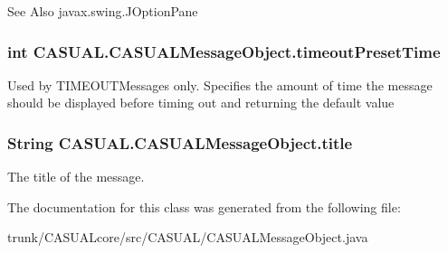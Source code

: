 \begin{DoxySeeAlso}{See Also}
javax.\-swing.\-J\-Option\-Pane 
\end{DoxySeeAlso}
\hypertarget{class_c_a_s_u_a_l_1_1_c_a_s_u_a_l_message_object_a87012881239a6672883c8a08cbadb52e}{
\subsubsection[{timeout\-Preset\-Time}]{\setlength{\rightskip}{0pt plus 5cm}int C\-A\-S\-U\-A\-L.\-C\-A\-S\-U\-A\-L\-Message\-Object.\-timeout\-Preset\-Time}}\label{class_c_a_s_u_a_l_1_1_c_a_s_u_a_l_message_object_a87012881239a6672883c8a08cbadb52e}
Used by T\-I\-M\-E\-O\-U\-T\-Messages only. Specifies the amount of time the message should be displayed before timing out and returning the default value \hypertarget{class_c_a_s_u_a_l_1_1_c_a_s_u_a_l_message_object_aa05172adf910fdff74387ea7e8a1c03f}{
\subsubsection[{title}]{\setlength{\rightskip}{0pt plus 5cm}String C\-A\-S\-U\-A\-L.\-C\-A\-S\-U\-A\-L\-Message\-Object.\-title}}\label{class_c_a_s_u_a_l_1_1_c_a_s_u_a_l_message_object_aa05172adf910fdff74387ea7e8a1c03f}
The title of the message. 

The documentation for this class was generated from the following file\-:\begin{DoxyCompactItemize}
\item 
trunk/\-C\-A\-S\-U\-A\-Lcore/src/\-C\-A\-S\-U\-A\-L/C\-A\-S\-U\-A\-L\-Message\-Object.\-java\end{DoxyCompactItemize}
